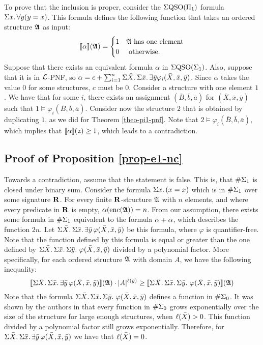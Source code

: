 To prove that the inclusion is proper, consider the $\Sigma{\rm QSO}(\Pi_{1})$ formula $\Sigma{x}.\,\forall y(y = x)$. This formula defines the following function that takes an ordered structure $\mathfrak{A}$ as input:
$$
{\llbracket{}{\alpha}\rrbracket}(\mathfrak{A}) = 
\begin{cases}
1 &\mathfrak{A} \text{ has one element}\\
0 &\text{ otherwise}.
\end{cases}
$$
Suppose that there exists an equivalent formula $\alpha$ in $\Sigma{\rm QSO}(\Sigma_{1})$. Also, suppose that it is in $\L$-PNF, so $\alpha = c + \sum_{i = 1}^n\Sigma{\bar{X}}.\,\Sigma{\bar{x}}.\,\exists\bar{y}\varphi_i(\bar{X},\bar{x},\bar{y})$. Since $\alpha$ takes the value 0 for some structures, $c$ must be 0. Consider a structure with one element $\mathfrak{1}$. We have that for some $i$, there exists an assignment $(\bar{B},\bar{b},\bar{a})$ for $(\bar{X},\bar{x},\bar{y})$ such that $\mathfrak{1}\models\varphi_i(\bar{B},\bar{b},\bar{a})$. Consider now the structure $\mathfrak{2}$ that is obtained by duplicating $\mathfrak{1}$, as we did for Theorem \ref{theo-pi1-pnf}. Note that $\mathfrak{2}\models\varphi_i(\bar{B},\bar{b},\bar{a})$, which implies that ${\llbracket{}{\alpha}\rrbracket}(\mathfrak{2}) \geq 1$, which leads to a contradiction.

\subsection*{Proof of Proposition \ref{prop-e1-nc}}

Towards a contradiction, assume that the statement is false. This is, that $\#\Sigma_{1}$ is closed under binary sum. Consider the formula $\Sigma{x}.\,(x = x)$ which is in $\#\Sigma_{1}$ over some signature $\mathbf{R}$. For every finite $\mathbf{R}$-structure $\mathfrak{A}$ with $n$ elements, and where every predicate in $\mathbf{R}$ is empty, $\alpha({\rm enc}(\mathfrak{A})) = n$. From our assumption, there exists some formula in $\#\Sigma_{1}$ equivalent to the formula $\alpha + \alpha$, which describes the function $2n$. Let $\Sigma{\bar{X}}.\,\Sigma{\bar{x}}.\,\exists\bar{y}\,\varphi(\bar{X},\bar{x},\bar{y})$ be this formula, where $\varphi$ is quantifier-free. Note that the function defined by this formula is equal or greater than the one defined by $\Sigma{\bar{X}}.\,\Sigma{\bar{x}}.\,\Sigma{\bar{y}}.\,\,\varphi(\bar{X},\bar{x},\bar{y})$ divided by a polynomial factor. More specifically, for each ordered structure $\mathfrak{A}$ with domain $A$, we have the following inequality:
$$
{\llbracket{}{\Sigma{\bar{X}}.\,\Sigma{\bar{x}}.\,\exists\bar{y}\,\varphi(\bar{X},\bar{x},\bar{y})}\rrbracket}(\mathfrak{A}) \cdot \vert A \vert^{\ell(\bar{y})} \geq {\llbracket{}{\Sigma{\bar{X}}.\,\Sigma{\bar{x}}.\,\Sigma{\bar{y}}.\,\,\varphi(\bar{X},\bar{x},\bar{y})}\rrbracket}(\mathfrak{A})
$$
Note that the formula $\Sigma{\bar{X}}.\,\Sigma{\bar{x}}.\,\Sigma{\bar{y}}.\,\,\varphi(\bar{X},\bar{x},\bar{y})$ defines a function in $\#\Sigma_{0}$. It was shown by the authors in \cite{SalujaST95} that every function in $\#\Sigma_{0}$ grows exponentially over the size of the structure for large enough structures, when $\ell(\bar{X}) > 0$. This function divided by a polynomial factor still grows exponentially. Therefore, for $\Sigma{\bar{X}}.\,\Sigma{\bar{x}}.\,\exists\bar{y}\,\varphi(\bar{X},\bar{x},\bar{y})$ we have that $\ell(\bar{X}) = 0$.

